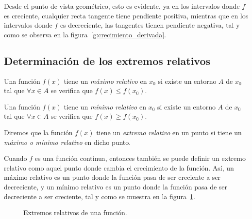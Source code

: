 Desde el punto de vista geométrico, esto es evidente, ya en los
intervalos donde $f$ es creciente, cualquier recta tangente tiene
pendiente positiva, mientras que en los intervalos donde $f$ es
decreciente, las tangentes tienen pendiente negativa, tal y como se
observa en la figura~\ref{g:crecimiento_derivada}.

\subsection{Determinación de los extremos relativos}
Una función $f(x)$ tiene un \emph{máximo relativo} en $x_0$ si
existe un entorno $A$ de $x_0$ tal que $\forall x \in A$ se verifica
que $f(x)\leq f(x_0)$.

Una función $f(x)$ tiene un \emph{mínimo relativo} en $x_0$ si
existe un entorno $A$ de $x_0$ tal que $\forall x\in A$ se verifica
que $f(x)\geq f(x_0)$.

Diremos que la función $f(x)$ tiene un \emph{extremo relativo} en un
punto si tiene un \emph{máximo o mínimo relativo} en dicho punto.

Cuando $f$ es una función continua, entonces también se puede
definir un extremo relativo como aquel punto donde cambia el
crecimiento de la función. Así, un máximo relativo es un punto donde
la función pasa de ser creciente a ser decreciente, y un mínimo
relativo es un punto donde la función pasa de ser decreciente a ser
creciente, tal y como se muestra en la figura~\ref{g:extremos_derivada}.

\begin{figure}[h!]
\centering {}\qquad
{}
\caption{Extremos relativos de una función.}
\label{g:extremos_derivada}
\end{figure}

